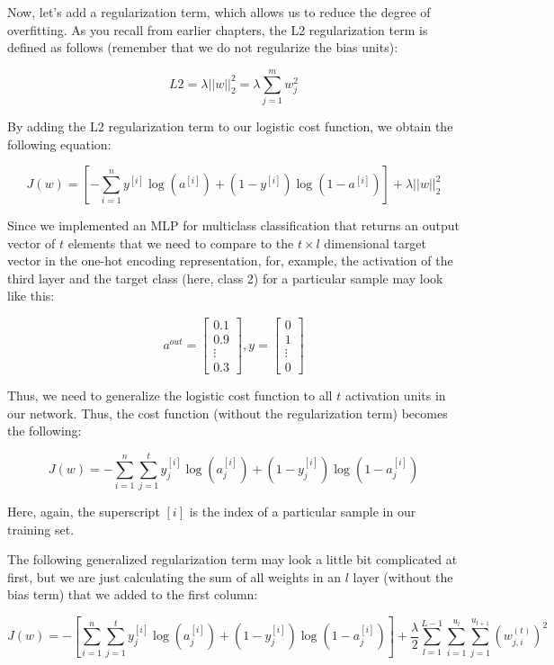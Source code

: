 \documentclass[11pt]{article}
\begin{document}
Now, let's add a regularization term, which allows us to reduce the
degree of overfitting. As you recall from earlier chapters, the L2
regularization term is defined as follows (remember that we do not
regularize the bias units):

\[L2 = \lambda||w||_2^2 = \lambda\sum_{j=1}^m w_j^2\]

By adding the L2 regularization term to our logistic cost function, we
obtain the following equation:

\[J(w) = \left[-\sum_{i=1}^n y^{[i]}\log(a^{[i]}) + (1 - y^{[i]})\log(1-a^{[i]})\right] + \lambda||w||_2^2\]

Since we implemented an MLP for multiclass classification that returns
an output vector of \(t\) elements that we need to compare to the
\(t \times l\) dimensional target vector in the one-hot encoding
representation, for, example, the activation of the third layer and the
target class (here, class 2) for a particular sample may look like this:

\[
a^{out} = 
\begin{bmatrix}
0.1 \\
0.9 \\
\vdots \\
0.3
\end{bmatrix}, 
y = 
\begin{bmatrix}
0 \\
1 \\
\vdots \\
0
\end{bmatrix}
\]

Thus, we need to generalize the logistic cost function to all \(t\)
activation units in our network. Thus, the cost function (without the
regularization term) becomes the following:

\[J(w) = -\sum_{i=1}^n\sum_{j=1}^t y_j^{[i]}\log(a_j^{[i]}) + (1 - y_j^{[i]})\log(1-a_j^{[i]})\]

Here, again, the superscript \([i]\) is the index of a particular sample
in our training set.

The following generalized regularization term may look a little bit
complicated at first, but we are just calculating the sum of all weights
in an \(l\) layer (without the bias term) that we added to the first
column:

\[J(w) = -\left[\sum_{i=1}^n\sum_{j=1}^t y_j^{[i]}\log(a_j^{[i]}) + (1 - y_j^{[i]})\log(1-a_j^{[i]})\right] + \frac{\lambda}{2}\sum_{l=1}^{L-1}\sum_{i=1}^{u_l}\sum_{j=1}^{u_{l+1}}(w_{j,i}^{(t)})^2\]
\end{document}
